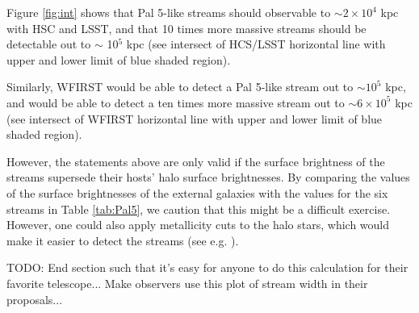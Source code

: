\documentclass[twocolumn]{aastex62}
\newcommand{\todo}[1]{{\color{red} TODO: #1}}
\begin{document}
Figure \ref{fig:int} shows that Pal 5-like streams should observable to $\sim 2\times 10^4$ kpc with HSC and LSST, and that 10 times more massive streams should be detectable out to $\sim$ 10$^5$ kpc (see intersect of HCS/LSST horizontal line with upper and lower limit of blue shaded region). 

Similarly, WFIRST would be able to detect a Pal 5-like stream out to $\sim 10^5$ kpc, and would be able to detect a ten times more massive stream out to $\sim 6 \times 10^5$ kpc (see intersect of WFIRST horizontal line with upper and lower limit of blue shaded region). 

However, the statements above are only valid if the surface brightness of the streams supersede their hosts' halo surface brightnesses. By comparing the values of the surface brightnesses of the external galaxies with the values for the six streams in Table \ref{tab:Pal5}, we caution that this might be a difficult exercise. However, one could also apply metallicity cuts to the halo stars, which would make it easier to detect the streams (see e.g. \citealt{ibata14}).

\todo{End section such that it's easy for anyone to do this calculation for their favorite telescope... Make observers use this plot of stream width in their proposals...}

\end{document}
